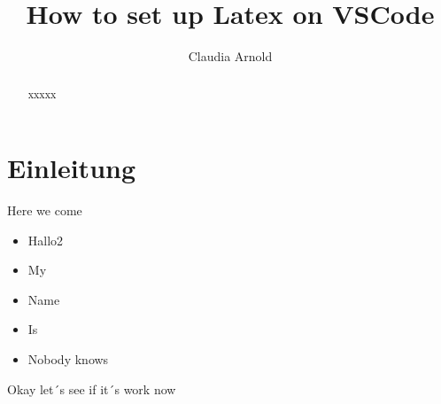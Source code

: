 \documentclass[12pt,titlepage]{article}
\begin{document}
\title{How to set up Latex on VSCode\\}

\author{Claudia Arnold}

\maketitle

\begin{abstract}
   xxxxx
    \end{abstract}

\section{Einleitung}

Here we come 


\begin{itemize}
    \item Hallo2 
    \item My
    \item Name
    \item Is
    \item Nobody knows
\end{itemize}


Okay let´s see if it´s work now
\end{document}
